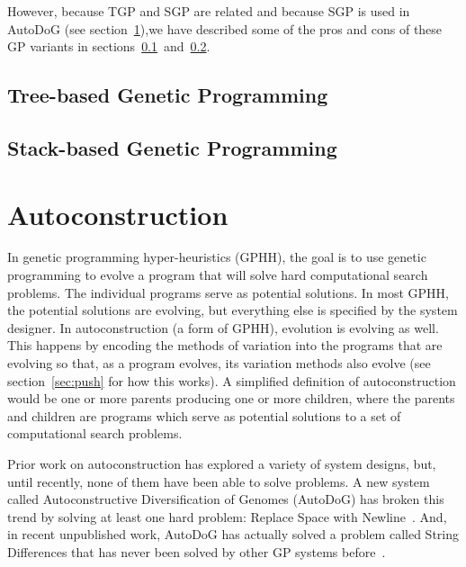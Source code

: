 \documentclass{sig-alternate}
\begin{document}
However, because TGP and SGP are related and because SGP is used in AutoDoG (see section~\ref{sec:ac}),we have described some of the pros and cons of these GP variants in sections~\ref{sec:tgp}~and~\ref{sec:sgp}.


\subsection{Tree-based Genetic Programming}
\label{sec:tgp}

\subsection{Stack-based Genetic Programming}
\label{sec:sgp}

\section{Autoconstruction}
\label{sec:ac}
In genetic programming hyper-heuristics (GPHH), the goal is to use genetic programming to evolve a program that will solve hard computational search problems. The individual programs serve as potential solutions. In most GPHH, the potential solutions are evolving, but everything else is specified by the system designer.  In autoconstruction (a form of GPHH), evolution is evolving as well. This happens by encoding the methods of variation into the programs that are evolving so that, as a program evolves, its variation methods also evolve (see section~\ref{sec:push} for how this works). A simplified definition of autoconstruction would be one or more parents producing one or more children, where the parents and children are programs which serve as potential solutions to a set of computational search problems.

Prior work on autoconstruction has explored a variety of system designs, but, until recently, none of them have been able to solve  problems. A new system called Autoconstructive Diversification of Genomes (AutoDoG) has broken this trend by solving at least one hard problem: Replace Space with Newline~\cite{spector:2016}. And, in recent unpublished work, AutoDoG has actually solved a problem called String Differences that has never been solved by other GP systems before~\cite{eva:2017}.
\end{document}
